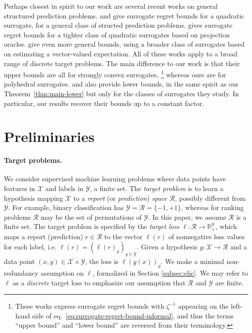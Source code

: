 \documentclass{article}
\theoremstyle{definition}\newtheorem{definition}{Definition}
\theoremstyle{definition}\newtheorem{assumption}{Assumption}
\newcommand{\reals}{\mathbb{R}}
\newcommand{\R}{\mathcal{R}}
\newcommand{\X}{\mathcal{X}}
\newcommand{\Y}{\mathcal{Y}}
\begin{document}
Perhaps closest in spirit to our work are several recent works on general structured prediction problems.
\citet[Theorem 2]{ciliberto2016consistent} and \citet[Theorem 7]{osokin2017structured} give surrogate regret bounds for a quadratic surrogate, for a general class of structed prediction problems.
\citet[Proposition 5]{blondel2019structured} gives surrogate regret bounds for a tighter class of quadratic surrogates based on projection oracles.
\citet[Theorem 4.4]{nowak2019general} give even more general bounds, using a broader class of surrogates based on estimating a vector-valued expectation.
All of these works apply to a broad range of discrete target problems.
The main difference to our work is that their upper bounds are all for strongly convex surrogates,%
\footnote{These works express surrogate regret bounds with $\zeta^{-1}$ appearing on the left-hand side of eq.~\eqref{eq:surrogate-regret-bound-informal}, and thus the terms ``upper bound'' and ``lower bound'' are reversed from their terminology.}
whereas ours are for polyhedral surrogates.
\citet[Theeorem 8]{osokin2017structured} and \citet[Theorem 4.5]{nowak2019general} also provide lower bounds, in the same spirit as our Theorem~\ref{thm:main-lower} but only for the classes of surrogates they study.
In particular, our results recover their bounds up to a constant factor.


\section{Preliminaries}


\paragraph{Target problems.}
We consider supervised machine learning problems where data points have features in $\X$ and labels in $\Y$, a finite set.
The \emph{target problem} is to learn a hypothesis mapping $\X$ to a \emph{report} (or \emph{prediction}) \emph{space} $\R$, possibly different from $\Y$.
For example, binary classification has $\Y = \R = \{-1,+1\}$, whereas for ranking problems $\R$ may be the set of permutations of $\Y$.
In this paper, we assume $\R$ is a finite set.
The target problem is specified by the \emph{target loss} $\ell:\R\to\reals^\Y_+$, which maps a report (prediction) $r \in \R$ to the vector $\ell(r)$ of nonnegative loss values for each label, i.e. $\ell(r) = (\ell(r)_y)_{y\in\Y}$.
Given a hypothesis $g: \X \to \R$ and a data point $(x,y) \in \X \times \Y$, the loss is $\ell(g(x))_y$.
We make a minimal non-redundancy assumption on $\ell$, formalized in Section \ref{subsec:elic}.
We may refer to $\ell$ as a \emph{discrete} target loss to emphasize our assumption that $\R$ and $\Y$ are finite.
\end{document}
